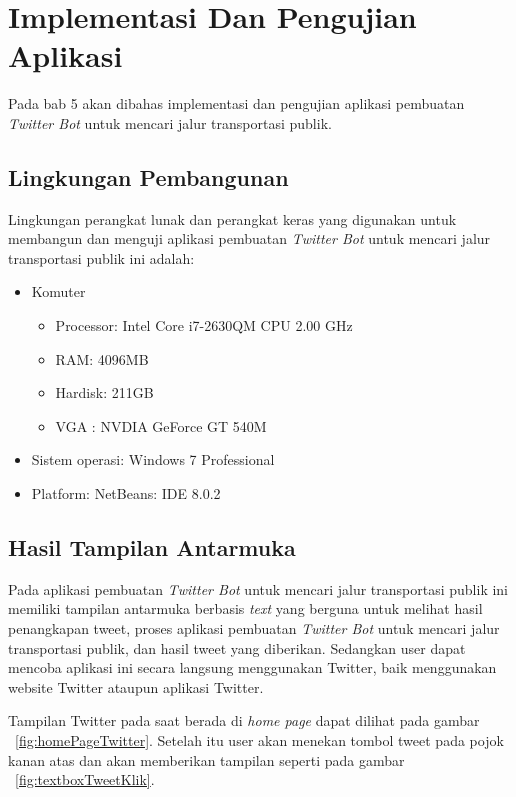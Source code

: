 \chapter{Implementasi Dan Pengujian Aplikasi}
\label{chap:implementasi dan pengujian aplikasi}

Pada bab 5 akan dibahas implementasi dan pengujian aplikasi pembuatan \textit{Twitter Bot} untuk mencari jalur transportasi publik.

\section{Lingkungan Pembangunan}
Lingkungan perangkat lunak dan perangkat keras yang digunakan untuk membangun dan menguji aplikasi pembuatan \textit{Twitter Bot} untuk mencari jalur transportasi publik ini adalah:
\begin{itemize}
	\item Komuter
	
	
	\begin{itemize}
		\item Processor: Intel Core i7-2630QM CPU 2.00 GHz
		\item RAM: 4096MB
		\item Hardisk: 211GB
		\item VGA : NVDIA GeForce GT 540M
	\end{itemize}
	\item Sistem operasi: Windows 7 Professional
	\item Platform: NetBeans: IDE 8.0.2
\end{itemize}

\section{Hasil Tampilan Antarmuka}
Pada aplikasi pembuatan \textit{Twitter Bot} untuk mencari jalur transportasi publik ini memiliki tampilan antarmuka berbasis \textit{text} yang berguna untuk melihat hasil penangkapan tweet, proses aplikasi pembuatan \textit{Twitter Bot} untuk mencari jalur transportasi publik, dan hasil tweet yang diberikan. Sedangkan user dapat mencoba aplikasi ini secara langsung menggunakan Twitter, baik menggunakan website Twitter ataupun aplikasi Twitter. 

Tampilan Twitter pada saat berada di \textit{home page} dapat dilihat pada gambar ~\ref{fig:homePageTwitter}. Setelah itu user akan menekan tombol tweet pada pojok kanan atas dan akan memberikan tampilan seperti pada gambar ~\ref{fig:textboxTweetKlik}.

